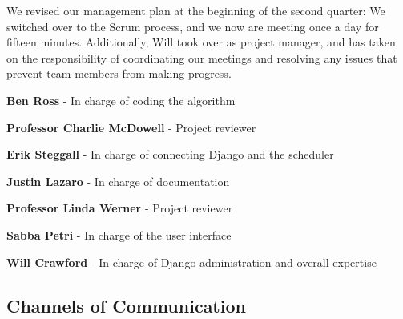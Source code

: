 \documentclass[12pt]{article}
\begin{document}
We revised our management plan at the beginning of the second quarter: We switched over to the Scrum process, and we now are meeting once a day for fifteen minutes. Additionally, Will took over as project manager, and has taken on the responsibility of coordinating our meetings and resolving any issues that prevent team members from making progress. 
	
\begin{description}
\item{\textbf{Ben Ross}} - In charge of coding the algorithm
\item{\textbf{Professor Charlie McDowell}} - Project reviewer
\item{\textbf{Erik Steggall}} - In charge of connecting Django and the scheduler
\item{\textbf{Justin Lazaro}} - In charge of documentation
\item{\textbf{Professor Linda Werner}} - Project reviewer
\item{\textbf{Sabba Petri}} - In charge of the user interface
\item{\textbf{Will Crawford}} - In charge of Django administration and overall expertise
\end{description}

\subsection{Channels of Communication}
\end{document}
